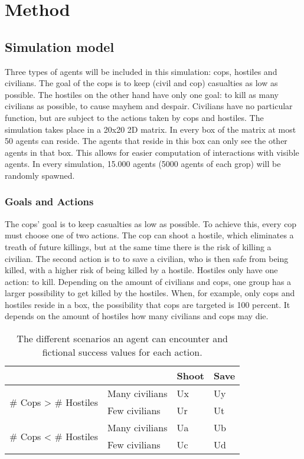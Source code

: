 \section{Method}
\subsection{Simulation model}
Three types of agents will be included in this simulation: cops, hostiles and civilians. The goal of the cops is to keep (civil and cop) casualties as low as possible. The hostiles on the other hand have only one goal: to kill as many civilians as possible, to cause mayhem and despair. Civilians have no particular function, but are subject to the actions taken by cops and hostiles. The simulation takes place in a 20x20 2D matrix. In every box of the matrix at most 50 agents can reside. The agents that reside in this box can only see the other agents in that box. This allows for easier computation of interactions with visible agents. In every simulation, 15.000 agents (5000 agents of each grop) will be randomly spawned.  

\subsubsection{Goals and Actions}
The cops' goal is to keep casualties as low as possible. To achieve this, every cop must choose one of two actions. The cop can shoot a hostile, which eliminates a treath of future killings, but at the same time there is the risk of killing a civilian. The second action is to to save a civilian, who is then safe from being killed, with a higher risk of being killed by a hostile. Hostiles only have one action: to kill. Depending on the amount of civilians and cops, one group has a larger possibility to get killed by the hostiles. When, for example, only cops and hostiles reside in a box, the possibility that cops are targeted is 100 percent. It depends on the amount of hostiles how many civilians and cops may die.

\begin{table}[!ht]
\begin{center}
\begin{tabular}{l l | l l}
\hline
 & & Shoot & Save \\
\hline
\multirow{2}{*}{\# Cops > \# Hostiles} & Many civilians & Ux & Uy \\
 & Few civilians & Ur & Ut \\
\hline
\multirow{2}{*}{\# Cops < \# Hostiles} & Many civilians & Ua & Ub\\
 & Few civilians & Uc & Ud\\
\hline
\end{tabular}
\caption{The different scenarios an agent can encounter and fictional success values for each action.}
\label{tab:scenarios}
\end{center}
\end{table}

